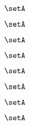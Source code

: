 \begin{forslides}
    \begin{equation}
        \label{eq:feedback-182}
        \setA
    \end{equation}

    \begin{equation}
        \label{eq:feedback-183}
        \setA
    \end{equation}

    \begin{equation}
        \label{eq:feedback-184}
        \setA
    \end{equation}

    \begin{equation}
        \label{eq:feedback-185}
        \setA
    \end{equation}

    \begin{equation}
        \label{eq:feedback-186}
        \setA
    \end{equation}

    \begin{equation}
        \label{eq:feedback-187}
        \setA
    \end{equation}

    \begin{equation}
        \label{eq:feedback-188}
        \setA
    \end{equation}

    \begin{equation}
        \label{eq:feedback-189}
        \setA
    \end{equation}

\end{forslides}